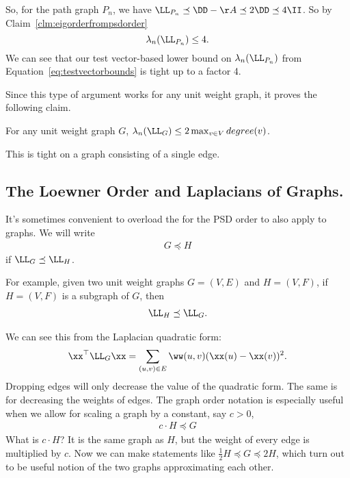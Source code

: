 So, for the path graph $P_n$, we have
$\LL_{P_n} \preceq \DD-\AA \preceq 2\DD \preceq 4 \II$.
So by Claim~\ref{clm:eigorderfrompsdorder}
\begin{equation}
  \label{eq:pathlambdamaxub}
\lambda_n(\LL_{P_n}) \leq 4.
\end{equation}
We can see that our test vector-based lower bound on $\lambda_n(\LL_{P_n})$ from
Equation~\eqref{eq:testvectorbounds} is tight up
to a factor 4.

Since this type of argument works for any unit weight graph, it proves the following claim.
\begin{claim}
  \label{clm:lambdamaxfromeig}
  For any unit weight graph $G$,
  $\lambda_{n}(\LL_G) \leq 2 \max_{v
    \in V} \mathop{degree}(v)$.
\end{claim}
This is tight on a graph consisting of a single edge.

\subsection{The Loewner Order and Laplacians of Graphs.}
It's sometimes convenient to overload the for the PSD order to also
apply to graphs. We will write
\begin{align*}
G \preceq H
\end{align*}
if $\LL_{G} \preceq
\LL_H$.

For example, given two unit weight graphs
$G = (V,E)$ and $H = (V,F)$, if $H = (V,F)$ is a subgraph of $G$,
then
\begin{align*}
\LL_H \preceq \LL_G.
\end{align*}

We can see this from the Laplacian quadratic form:
\begin{align*}
\xx^\top \LL_G \xx = \sum_{ (u,v) \in E } \ww(u,v) ( \xx(u) - \xx(v) )^2.
\end{align*}
Dropping edges will only decrease the value of the quadratic form. The
same is for decreasing the weights of edges.
The graph order notation is especially useful when we allow for
scaling a graph by a constant, say $c > 0$,
\begin{align*}
c \cdot H \preceq G
\end{align*}
What is $c \cdot H$? It is the same graph as $H$, but the weight of
every edge is multiplied by $c$.
Now we can make statements like $\frac{1}{2} H \preceq G \preceq 2 H$,
which turn out to be useful notion of the two graphs approximating
each other.

